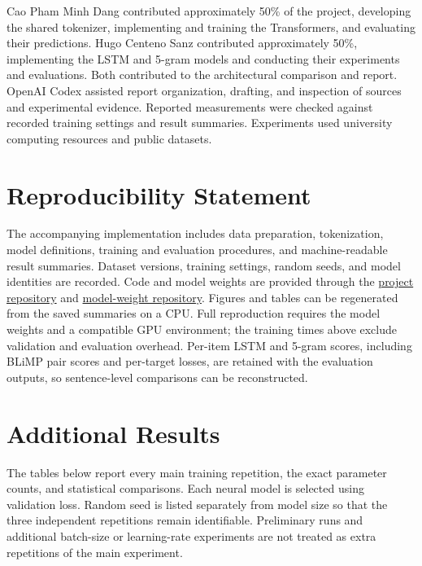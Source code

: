 \documentclass[10pt]{article}
\begin{document}
Cao Pham Minh Dang contributed approximately 50\% of the project, developing the shared tokenizer, implementing and training the Transformers, and evaluating their predictions. Hugo Centeno Sanz contributed approximately 50\%, implementing the LSTM and 5-gram models and conducting their experiments and evaluations. Both contributed to the architectural comparison and report. OpenAI Codex assisted report organization, drafting, and inspection of sources and experimental evidence. Reported measurements were checked against recorded training settings and result summaries. Experiments used university computing resources and public datasets.

\section*{Reproducibility Statement}

The accompanying implementation includes data preparation, tokenization, model definitions, training and evaluation procedures, and machine-readable result summaries. Dataset versions, training settings, random seeds, and model identities are recorded. Code and model weights are provided through the \href{https://github.com/dangpmcao/NLP-Project}{project repository} and \href{https://huggingface.co/centenohugo/context-not-grammar}{model-weight repository}. Figures and tables can be regenerated from the saved summaries on a CPU. Full reproduction requires the model weights and a compatible GPU environment; the training times above exclude validation and evaluation overhead. Per-item LSTM and 5-gram scores, including BLiMP pair scores and per-target losses, are retained with the evaluation outputs, so sentence-level comparisons can be reconstructed.

\label{lastmainpage}
\clearpage



\clearpage
\appendix
\section{Additional Results}

The tables below report every main training repetition, the exact parameter counts, and statistical comparisons. Each neural model is selected using validation loss. Random seed is listed separately from model size so that the three independent repetitions remain identifiable. Preliminary runs and additional batch-size or learning-rate experiments are not treated as extra repetitions of the main experiment.
\end{document}
